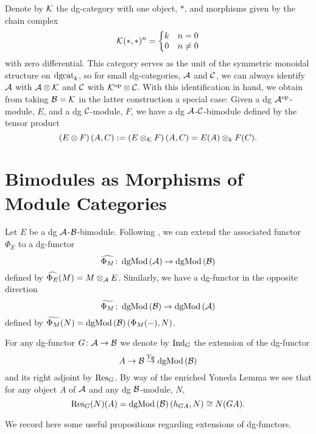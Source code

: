 \begin{remark}\label{rem: tensor over k}
  Denote by \(\mathcal{K}\) the dg-category with one object, \(\ast\), and morphisms given by the chain complex
  \[\mathcal{K}(\ast,\ast)^n =
  \left\{ \begin{matrix}
    k & n = 0\\
    0 & n \neq 0
  \end{matrix}\right.\]  with zero differential.
  This category serves as the unit of the symmetric monoidal structure on \(\operatorname{dgcat}_k\), so for small dg-categories, \(\mathcal{A}\) and \(\mathcal{C}\), we can always identify \(\mathcal{A}\) with \(\mathcal{A} \otimes \mathcal{K}\) and \(\mathcal{C}\) with \(\mathcal{K}^{\operatorname{op}} \otimes \mathcal{C}\).
  With this identification in hand, we obtain from taking \(\mathcal{B} = \mathcal{K}\) in the latter construction a special case:
  Given a dg \(\mathcal{A}^{\operatorname{op}}\)-module, \(E\), and a dg \(\mathcal{C}\)-module, \(F\), we have a dg \(\mathcal{A}\)-\(\mathcal{C}\)-bimodule defined by the tensor product
  \[\left(E \otimes F\right)(A,C) := \left(E \otimes_{\mathcal{K}} F\right)(A,C) = E(A) \otimes_k F(C).\]
\end{remark}

\section{Bimodules as Morphisms of Module Categories}
Let \(E\) be a dg \(\mathcal{A}\)-\(\mathcal{B}\)-bimodule.
Following \parencite[Section 3]{CS15}, we can extend the associated functor \(\Phi_E\) to a dg-functor
\[\widehat{\Phi_M} \colon \operatorname{dgMod}\left(\mathcal{A}\right) \to \operatorname{dgMod}\left(\mathcal{B}\right)\]
defined by \(\widehat{\Phi_E}(M) = M \otimes_{\mathcal{A}} E\).
Similarly, we have a dg-functor in the opposite direction
\[\widetilde{\Phi_M} \colon \operatorname{dgMod}\left(\mathcal{B}\right) \to \operatorname{dgMod}\left(\mathcal{A}\right)\]
defined by \(\widetilde{\Phi_M}(N) = \operatorname{dgMod}\left(\mathcal{B}\right)(\Phi_M( - ), N)\).

For any dg-functor \(G \colon \mathcal{A} \to \mathcal{B}\) we denote by \(\operatorname{Ind}_{G}\) the extension of the dg-functor
\[A \to \mathcal{B} \overset{Y_{\mathcal{B}}}\to \operatorname{dgMod}\left(\mathcal{B}\right)\]
and its right adjoint by \(\operatorname{Res}_{G}\).
By way of the enriched Yoneda Lemma we see that for any object \(A\) of \(\mathcal{A}\) and any dg \(\mathcal{B}\)-module, \(N\), 
\[\operatorname{Res}_{G}(N)(A) = \operatorname{dgMod}\left(\mathcal{B}\right)(h_{GA}, N) \cong N(GA).\]

We record here some useful propositions regarding extensions of dg-functors.

